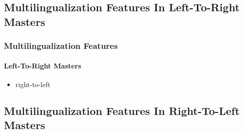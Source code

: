 \subsection{Multilingualization Features In Left-To-Right Masters}


\begin{comment}
*****  [[elisp:(org-cycle)][| ]]  [[elisp:(blee:ppmm:org-mode-toggle)][Nat]] [[elisp:(beginning-of-buffer)][Top]] [[elisp:(delete-other-windows)][(1)]] || /Frame/ *Label=MultilingualizationFeatures*  Multilingualization Features ::  [[elisp:(org-cycle)][| ]]
\end{comment}

\begin{frame}[fragile,label=MultilingualizationFeatures]
    \frametitle{Multilingualization Features}
    \framesubtitle{Left-To-Right Masters}

    \begin{itemize}
    \item right-to-left
    \end{itemize}

\end{frame}


\begin{comment}
**  [[elisp:(org-cycle)][| ]] [[elisp:(org-show-subtree)][|=]] [[elisp:(show-children 10)][|V]] [[elisp:(bx:orgm:indirectBufOther)][|>]] [[elisp:(bx:orgm:indirectBufMain)][|I]] [[elisp:(blee:ppmm:org-mode-toggle)][|N]] [[elisp:(org-top-overview)][|O]] [[elisp:(progn (org-shifttab) (org-content))][|C]] [[elisp:(delete-other-windows)][|1]]  /Subsection/   Multilingualization Features In Right-To-Left Masters ::  [[elisp:(org-cycle)][| ]]
\end{comment}

\subsection{Multilingualization Features In Right-To-Left Masters}


